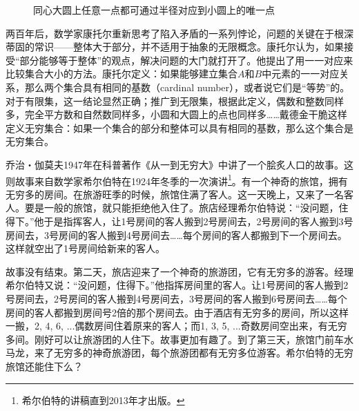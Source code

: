 \documentclass[b5paper]{ctexart}
\begin{document}
\begin{figure}[htbp]
 \centering

 \caption{同心大圆上任意一点都可通过半径对应到小圆上的唯一点}
 \label{fig:circles-paradox}
\end{figure}

 
两百年后，数学家康托尔重新思考了陷入矛盾的一系列悖论，问题的关键在于根深蒂固的常识——整体大于部分，并不适用于抽象的无限概念。康托尔认为，如果接受“部分能够等于整体”的观点，解决问题的大门就打开了。他提出了用一一对应来比较集合大小的方法。康托尔定义：如果能够建立集合$A$和$B$中元素的一一对应关系，那么两个集合具有相同的基数（cardinal number），或者说它们是“等势”的。对于有限集，这一结论显然正确；推广到无限集，根据此定义，偶数和整数同样多，完全平方数和自然数同样多，小圆和大圆上的点也同样多……戴德金干脆这样定义无穷集合：如果一个集合的部分和整体可以具有相同的基数，那么这个集合是无穷集合\cite{Dedekind-1858}。

乔治・伽莫夫1947年在科普著作《从一到无穷大》中讲了一个脍炙人口的故事。这则故事来自数学家希尔伯特在1924年冬季的一次演讲\footnote{希尔伯特的讲稿直到2013年才出版。}。有一个神奇的旅馆，拥有无穷多的房间。在旅游旺季的时候，旅馆住满了客人。这一天晚上，又来了一名客人。要是一般的旅馆，就只能拒绝他入住了。旅店经理希尔伯特说：“没问题，住得下。”他于是指挥客人，让1号房间的客人搬到2号房间去，2号房间的客人搬到3号房间去，3号房间的客人搬到4号房间去……每个房间的客人都搬到下一个房间去。这样就空出了1号房间给新来的客人。

故事没有结束。第二天，旅店迎来了一个神奇的旅游团，它有无穷多的游客。经理希尔伯特又说：“没问题，住得下。”他指挥房间里的客人。让1号房间的客人搬到2号房间去，2号房间的客人搬到4号房间去，3号房间的客人搬到6号房间去……每个房间的客人都搬到房间号2倍的那个房间去。由于酒店有无穷多的房间，所以这样一搬，2, 4, 6, ...偶数房间住着原来的客人；而1, 3, 5, ...奇数房间空出来，有无穷多间。刚好可以让旅游团的人住下。故事更加有趣了。到了第三天，旅馆门前车水马龙，来了无穷多的神奇旅游团，每个旅游团都有无穷多位游客。希尔伯特的无穷旅馆还能住下么？
\end{document}
